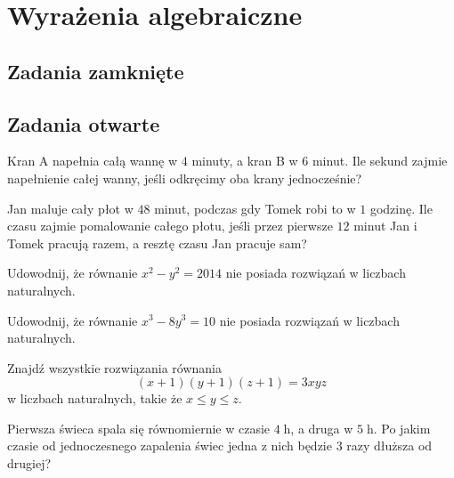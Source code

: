 \setcounter{parc}{0}
\addtocounter{chapc}{1}

\chapter{Wyrażenia algebraiczne}

\section{Zadania zamknięte}

\section{Zadania otwarte}

\zadanie Kran A napełnia całą wannę w $4$ minuty, a kran B w $6$ minut. Ile sekund zajmie napełnienie całej wanny, jeśli odkręcimy oba krany jednocześnie?

\zadanie Jan maluje cały płot w $48$ minut, podczas gdy Tomek robi to w $1$ godzinę. Ile czasu zajmie pomalowanie całego płotu, jeśli przez pierwsze $12$ minut Jan i Tomek pracują razem, a resztę czasu Jan pracuje sam?

\zadanie Udowodnij, że równanie $x^2 - y^2 = 2014$ nie posiada rozwiązań w liczbach naturalnych.

\zadanie Udowodnij, że równanie $x^3 - 8y^3 = 10$ nie posiada rozwiązań w liczbach naturalnych.

\zadanie Znajdź wszystkie rozwiązania równania \[{(x + 1)(y + 1)(z + 1) = 3xyz}\] w liczbach naturalnych, takie że $x \leqslant y \leqslant z$.

\zadanie Pierwsza świeca spala się równomiernie w czasie $4\;$h, a druga w $5\;$h. Po jakim czasie od jednoczesnego zapalenia świec jedna z nich będzie $3$ razy dłuższa od drugiej? %